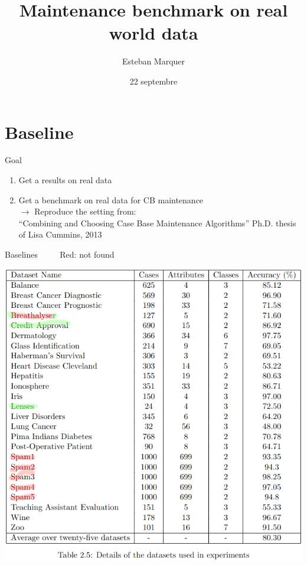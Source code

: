 \documentclass[]{beamer}
\title{Maintenance benchmark on real world data}
\author{Esteban Marquer}
\date{22 septembre}
\begin{document}
\begin{frame}
    \titlepage
\end{frame}
\section{Baseline}
\begin{frame}{Goal}
    \begin{enumerate}
        \item Get a results on real data
        \item Get a benchmark on real data for CB maintenance\\
        $\rightarrow$ Reproduce the setting from:\\

        ``Combining and Choosing Case Base Maintenance Algorithms''
        Ph.D. thesis of Lisa Cummins, 2013
    \end{enumerate}
    

\end{frame}
\begin{frame}
    \tableofcontents
\end{frame}
\begin{frame}{Baselines ~~{~~{\color{red} Red: not found}}}
    \begin{center}
        \includegraphics[width=.85\textwidth]{tab2_5_.png}
    \end{center}
    
\end{frame}
\end{document}
